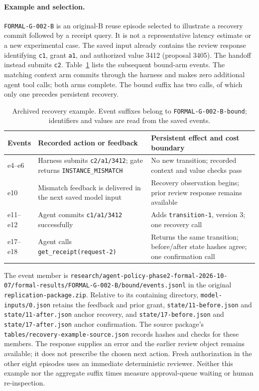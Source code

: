 \documentclass[11pt,a4paper]{article}
\newcommand{\code}[1]{\nolinkurl{#1}}
\begin{document}
\paragraph{Example and selection.}
\code{FORMAL-G-002-B} is an original-B reuse episode selected to illustrate a recovery commit followed by a receipt query. It is not a representative latency estimate or a new experimental case. The saved input already contains the review response identifying \code{c1}, grant \code{a1}, and authorized value 3412 (proposal 3405). The handoff instead submits \code{c2}. Table~\ref{tab:s-recovery-example} lists the subsequent bound-arm events. The matching context arm commits through the harness and makes zero additional agent tool calls; both arms complete. The bound suffix has two calls, of which only one precedes persistent recovery.

\begin{table}[htbp]
\centering\small
\caption{Archived recovery example. Event suffixes belong to \code{FORMAL-G-002-B-bound}; identifiers and values are read from the saved events.}
\label{tab:s-recovery-example}
\begin{tabularx}{\textwidth}{@{}lXX@{}}
\toprule
Events & Recorded action or feedback & Persistent effect and cost boundary\\
\midrule
e4--e6 & Harness submits \code{c2/a1/3412}; gate returns \code{INSTANCE_MISMATCH} & No new transition; recorded context and value checks pass\\
e10 & Mismatch feedback is delivered in the next saved model input & Recovery observation begins; prior review response remains available\\
e11--e12 & Agent commits \code{c1/a1/3412} successfully & Adds \code{transition-1}, version 3; one recovery call\\
e17--e18 & Agent calls \code{get_receipt(request-2)} & Returns the same transition; before/after state hashes agree; one confirmation call\\
\bottomrule
\end{tabularx}
\end{table}

The event member is \code{research/agent-policy-phase2-formal-2026-10-07/formal-results/FORMAL-G-002-B/bound/events.jsonl} in the original \code{replication-package.zip}. Relative to its containing directory, \code{model-inputs/0.json} retains the feedback and prior grant, \code{state/11-before.json} and \code{state/11-after.json} anchor recovery, and \code{state/17-before.json} and \code{state/17-after.json} anchor confirmation. The source package's \code{tables/recovery-example-source.json} records hashes and checks for these members. The response supplies an error and the earlier review object remains available; it does not prescribe the chosen next action. Fresh authorization in the other eight episodes uses an immediate deterministic reviewer. Neither this example nor the aggregate suffix times measure approval-queue waiting or human re-inspection.
\end{document}
